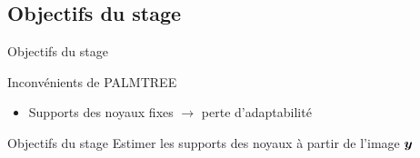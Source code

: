 \subsection{Objectifs du stage}
\begin{frame}{Objectifs du stage}
\begin{figure}\centering
\end{figure}
\begin{alertblock}{Inconvénients de PALMTREE}\centering
\begin{itemize}
\item Supports des noyaux \alert{fixes} $\rightarrow$ perte d'adaptabilité
\end{itemize}
\end{alertblock}
\begin{exampleblock}{Objectifs du stage} \centering
Estimer les supports des noyaux à partir de l'image $\bm{y}$
\end{exampleblock}
\end{frame}




